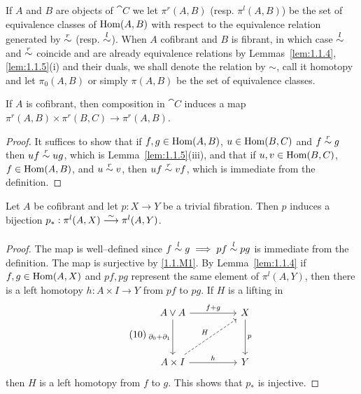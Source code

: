\documentclass[../main]{subfiles}
\begin{document}
If $A$ and $B$ are objects of $\cat C$ we let $\pi^r(A, B)$ (resp. $\pi^l(A, B)$) be the set of equivalence classes of $\operatorname{Hom}(A, B)$ with respect to the equivalence relation generated by $\overset{r}{\sim}$ (resp. $\overset{l}{\sim}$). When $A$ cofibrant and $B$ is fibrant, in which case $\overset{l}{\sim}$ and $\overset{r}{\sim}$ coincide and are already equivalence relations by Lemmas~\ref{lem:1.1.4}, \ref{lem:1.1.5}(i) and their duals, we shall denote the relation by $\sim$, call it homotopy and let $\pi_0(A, B)$ or simply $\pi(A, B)$ be the set of equivalence classes. 

\begin{lemma}
\label{lem:1.6}
If $A$ is cofibrant, then composition in $\cat C$ induces a map \newline$\pi^r(A, B) \times \pi^r(B, C) \longrightarrow \pi^r(A, B)$.
\end{lemma}

\begin{proof}
It suffices to show that if $f, g \in \operatorname{Hom}(A, B)$, $u \in \operatorname{Hom}(B, C)$ and $f \overset{r}{\sim} g$ then $uf \overset{r}{\sim} ug$, which is Lemma~\ref{lem:1.1.5}(iii), and that if $u, v \in \operatorname{Hom}(B, C)$,\\ $f \in \operatorname{Hom}(A, B)$, and $u \overset{r}{\sim} v$, then $uf \overset{r}{\sim} vf$, which is immediate from the definition.  
\end{proof} 

\begin{lemma}
\label{lem:1.1.7}
Let $A$ be cofibrant and let $p : X \longrightarrow Y$ be a trivial fibration. Then $p$ induces a bijection $p_\ast : \pi^l(A, X) \varrightarrow{\sim} \pi^l(A, Y)$.
\end{lemma} 

\begin{proof}
The map is well--defined since $f \overset{l}{\sim} g \implies pf \overset{l}{\sim} pg$ is immediate from the definition. The map is surjective by \ref{1.1.M1}. By Lemma~\ref{lem:1.1.4} if $f, g \in \operatorname{Hom}(A, X)$ and $pf, pg$ represent the same element of $\pi^l(A, Y)$, then there is a left homotopy $h : A \times I \longrightarrow Y$ from $pf$ to $pg$. If $H$ is a lifting in 
\[\tag{10}\label{diag:1.1.10}
    \begin{tikzcd}
    A \vee A \arrow[dd, "\partial_0 + \partial_1"'] \arrow[rr, "f +g"] &  & X \arrow[dd, "p"] \\
                                                                       &  &                   \\
    A \times I \arrow[rr, "h"] \arrow[rruu, "H", dashed]               &  & Y                
    \end{tikzcd}
\]
then $H$ is a left homotopy from $f$ to $g$. This shows that $p_\ast$ is injective.
\end{proof} 
\end{document}
